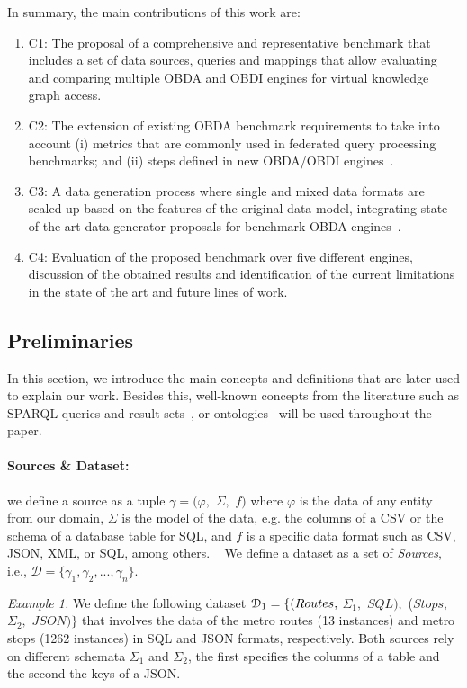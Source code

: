 In summary, the main contributions of this work are:
\begin{enumerate}
    \item C1: The proposal of a comprehensive and representative benchmark that includes a set of data sources, queries and mappings that allow evaluating and comparing multiple %
    OBDA and OBDI engines for virtual knowledge graph access.
    \item C2: The extension of existing OBDA benchmark requirements to take into account (i) metrics that are commonly used in federated query processing benchmarks; and (ii) steps defined in new OBDA/OBDI engines~\citep{corcho2019towards}.
    \item C3: A data generation process where single and mixed data formats are scaled-up based on the features of the  original data model, integrating state of the art data generator proposals for benchmark OBDA engines~\citep{lantivig}.
    \item C4: Evaluation of the proposed benchmark over five different engines, discussion of the obtained results and identification of the current limitations in the state of the art and future lines of work. 
\end{enumerate}


\subsection{Preliminaries}

In this section, we introduce the main concepts and definitions that are later used to explain our work. Besides this, well-known concepts from the literature such as SPARQL queries and result sets~\citep{w3c2013sparql}, or ontologies~\citep{mcguinness2004owl} will be used throughout the paper.

\paragraph{\textbf{Sources \& Dataset:}} we define a source as a tuple $\gamma=(\varphi,$ $\Sigma ,$ $f)$ where $\varphi$ is the data of any entity from our domain, $\Sigma$ is the model of the data, e.g. the columns of a CSV or the schema of a database table for SQL, and $f$ is a specific data format such as CSV, JSON, XML, or SQL, among others.%
~ We define a dataset as a set of \textit{Sources}, i.e., $\mathcal{D}=\{\gamma_1,\gamma_2, ..., \gamma_n\}$. 

\textit{Example 1.} We define the following dataset $\mathcal{D}_{1}=\{(Rou\-tes,$ $\Sigma_1,$ $SQL),$ ($Stops,$ $\Sigma_2,$ $JSON)\}$ that involves the data of the metro routes (13 instances) and metro stops (1262 instances) in SQL and JSON formats, respectively. Both sources rely on different schemata $\Sigma_1$ and $\Sigma_2$, the first specifies the columns of a table and the second the keys of a JSON.

